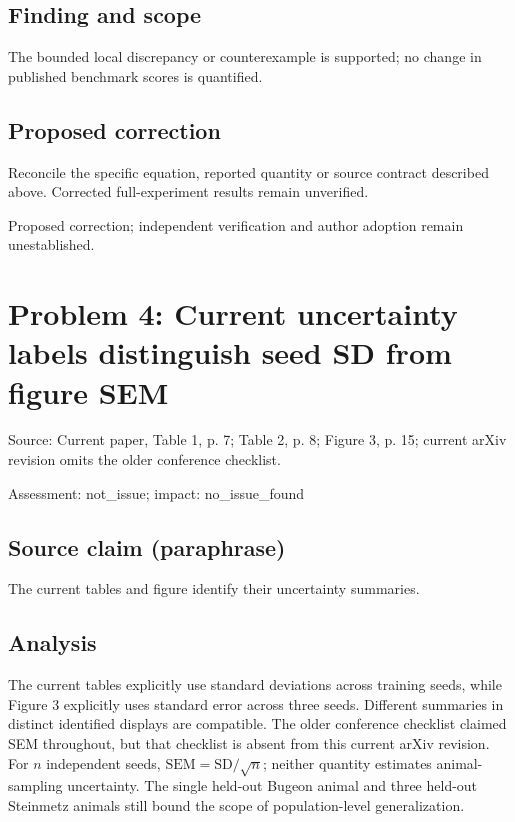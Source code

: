 \documentclass[11pt]{article}
\begin{document}
\subsection*{Finding and scope}

The bounded local discrepancy or counterexample is supported; no change in published benchmark scores is quantified.

\subsection*{Proposed correction}

Reconcile the specific equation, reported quantity or source contract described above. Corrected full-experiment results remain unverified.

Proposed correction; independent verification and author adoption remain unestablished.

\section*{Problem 4: Current uncertainty labels distinguish seed SD from figure SEM}

Source: Current paper, Table 1, p. 7; Table 2, p. 8; Figure 3, p. 15; current arXiv revision omits the older conference checklist.

Assessment: not\_issue; impact: no\_issue\_found

\subsection*{Source claim (paraphrase)}

The current tables and figure identify their uncertainty summaries.

\subsection*{Analysis}

The current tables explicitly use standard deviations across training seeds, while Figure 3 explicitly uses standard error across three seeds. Different summaries in distinct identified displays are compatible. The older conference checklist claimed SEM throughout, but that checklist is absent from this current arXiv revision. For \(n\) independent seeds, \(\mathrm{SEM}=\mathrm{SD}/\sqrt n\); neither quantity estimates animal-sampling uncertainty. The single held-out Bugeon animal and three held-out Steinmetz animals still bound the scope of population-level generalization.
\end{document}
